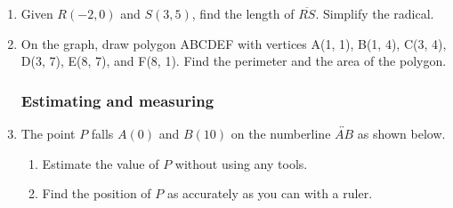\documentclass[12pt, twoside]{article}
\begin{document}
\begin{enumerate}
  \item Given $R(-2,0)$ and $S(3,5)$, find the length of $\overline{RS}$. Simplify the radical. \vspace{4cm}

  \item On the graph, draw polygon ABCDEF with vertices A(1, 1), B(1, 4), C(3, 4), D(3, 7), E(8, 7), and F(8, 1). Find the perimeter and the area of the polygon.\\[1cm]
  \vspace{2cm}

\newpage
\subsubsection*{Estimating and measuring}
  \item The point $P$ falls $A(0)$ and $B(10)$ on the numberline $\overleftrightarrow{AB}$ as shown below. \\[15pt] %
  \begin{enumerate}
    \item Estimate the value of $P$ without using any tools. \vspace{1cm} 
    \item Find the position of $P$ as accurately as you can with a ruler. 
  \end{enumerate} \vspace{1cm} 


\end{enumerate}
\end{document}

